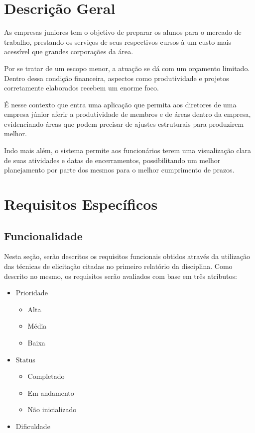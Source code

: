 \begin{apendicesenv}
\section{Descrição Geral}

  As empresas juniores tem o objetivo de preparar os alunos para o mercado de trabalho, prestando os serviços de seus respectivos cursos à um custo mais acessível que grandes corporações da área.

  Por se tratar de um escopo menor, a atuação se dá com um orçamento limitado. Dentro dessa condição financeira, aspectos como produtividade e projetos corretamente elaborados recebem um enorme foco.

  É nesse contexto que entra uma aplicação que permita aos diretores de uma empresa júnior aferir a produtividade de membros e de áreas dentro da empresa, evidenciando áreas que podem precisar de ajustes estruturais para produzirem melhor.

  Indo mais além, o sistema permite aos funcionários terem uma visualização clara de suas atividades e datas de encerramentos, possibilitando um melhor planejamento por parte dos mesmos para o melhor cumprimento de prazos.

\section{Requisitos Específicos}

\subsection{Funcionalidade}

  Nesta seção, serão descritos os requisitos funcionais obtidos através da utilização das técnicas de elicitação citadas no primeiro relatório da disciplina. Como descrito no mesmo, os requisitos serão avaliados com base em três atributos:

\begin{itemize}
\item{
  Prioridade

  \begin{itemize}
    \item{Alta}
    \item{Média}
    \item{Baixa}
  \end{itemize}
}
\item{
  Status

  \begin{itemize}
    \item{Completado}
    \item{Em andamento}
    \item{Não inicializado}
  \end{itemize}
}
\item{
  Dificuldade

}
\end{itemize}
\end{apendicesenv}
